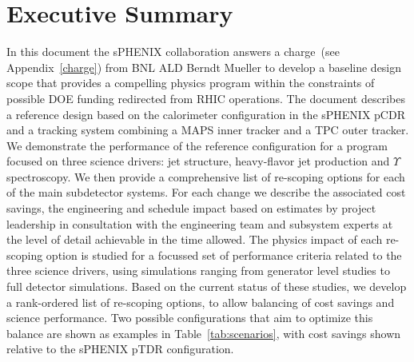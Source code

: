 \section*{Executive Summary}
\label{executive_summary}
\setcounter{page}{1}

\nocite{*}

In this document the sPHENIX collaboration answers a charge~(see
Appendix~\ref{charge}) from BNL ALD Berndt Mueller to develop a
baseline design scope that provides a compelling physics program
within the constraints of possible DOE funding redirected from RHIC
operations. The document describes a reference design based on the
calorimeter configuration in the sPHENIX pCDR and a tracking system
combining a MAPS inner tracker and a TPC outer tracker. We
demonstrate the performance of the reference configuration for a 
program focused on three science drivers: jet
structure, heavy-flavor jet production and $\Upsilon$ spectroscopy.
We then provide a comprehensive list of re-scoping options for each of
the main subdetector systems. For each change we describe the
associated cost savings, the engineering and schedule impact based on
estimates by project leadership in consultation with the engineering
team and subsystem experts at the level of detail achievable in the
time allowed.  The physics impact of each re-scoping option is studied
for a focussed set of performance criteria related to the three
science drivers, using simulations ranging from generator level
studies to full detector simulations. Based on the current status of
these studies, we develop a rank-ordered list of re-scoping options,
to allow balancing of cost savings and science
performance. Two possible configurations that aim to optimize this 
balance are shown as examples in Table~\ref{tab:scenarios},
with cost savings shown relative to the sPHENIX pTDR configuration.

